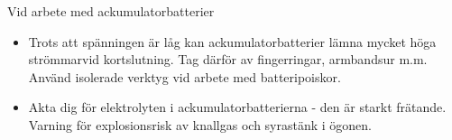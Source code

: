Vid arbete med ackumulatorbatterier
\begin{itemize}
\item Trots att spänningen är låg kan ackumulatorbatterier lämna
  mycket höga strömmarvid kortslutning. Tag därför av fingerringar,
  armbandsur m.m. Använd isolerade verktyg vid arbete med
  batteripoiskor.
\item Akta dig för elektrolyten i ackumulatorbatterierna - den är
  starkt frätande.  Varning för explosionsrisk av knallgas och
  syrastänk i ögonen.
\end{itemize}
